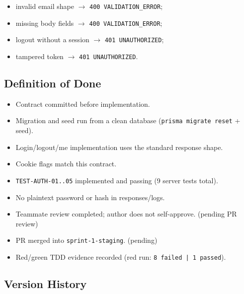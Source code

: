 \documentclass[11pt,a4paper]{article}
\begin{document}
\begin{itemize}[leftmargin=*,itemsep=2pt,topsep=2pt]
  \item invalid email shape $\rightarrow$ \texttt{400 VALIDATION\_ERROR};
  \item missing body fields $\rightarrow$ \texttt{400 VALIDATION\_ERROR};
  \item logout without a session $\rightarrow$ \texttt{401 UNAUTHORIZED};
  \item tampered token $\rightarrow$ \texttt{401 UNAUTHORIZED}.
\end{itemize}

\subsection{Definition of Done}

\begin{itemize}[leftmargin=*,itemsep=2pt,topsep=2pt]
  \item [x] Contract committed before implementation.
  \item [x] Migration and seed run from a clean database (\texttt{prisma migrate reset} + seed).
  \item [x] Login/logout/me implementation uses the standard response shape.
  \item [x] Cookie flags match this contract.
  \item [x] \texttt{TEST-AUTH-01..05} implemented and passing (9 server tests total).
  \item [x] No plaintext password or hash in responses/logs.
  \item [ ] Teammate review completed; author does not self-approve. (pending PR review)
  \item [ ] PR merged into \texttt{sprint-1-staging}. (pending)
  \item [x] Red/green TDD evidence recorded (red run: \texttt{8 failed | 1 passed}).
\end{itemize}

\subsection{Version History}
\end{document}
